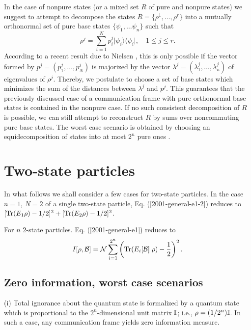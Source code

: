 In the case of nonpure states (or a mixed set $R$ of pure and nonpure states)
we suggest
to attempt to decompose the  states $R =\{\rho^1,\ldots ,\rho^r\}$
into a mutually orthonormal set of pure base states  $\{ \psi_1, \ldots \psi_n\}$
such that
\begin{equation}
\rho^j =\sum_{i=1}^N p^j_i \vert \psi_i \rangle \langle \psi_i \vert ,
\quad 1\le j\le r.
\end{equation}
According to a recent result due to Nielsen  \cite{nielsen-2000}, this is only possible
if the vector formed by $p^j=(p^j_1,\ldots , p^j_N)$ is majorized by the
vector $\lambda^j =(\lambda^j_1, \ldots ,\lambda^j_n)$ of eigenvalues of $\rho^j$.
Thereby, we postulate to choose a set of base states which minimizes
the sum of the distances  between $\lambda^j$ and $p^j$.
This guarantees that the previously discussed case of a communication frame
with pure orthonormal base states is contained in the nonpure case.
If no such consistent decomposition of $R$ is possible, we can still
attempt to reconstruct $R$ by sums over noncommuting pure base states.
The worst case scenario is obtained by choosing
an equidecomposition of
states into at most $2^n$ pure ones \cite{nielsen-2000}.

\section{Two-state particles}

In what follows we shall consider a few cases for two-state particles.
In the case $n=1$, $N=2$ of a single  two-state particle,
Eq. (\ref{2001-general-e1-2}) reduces to $ [{\rm Tr} (E_1\rho)- 1/2]^2+[{\rm Tr} (E_2\rho)- 1/2]^2$.

For $n$ $2$-state particles.
Eq. (\ref{2001-general-e1}) reduces to
\begin{equation}
I[\rho ,{\cal B} ]= {\cal N}\sum_{i=1}^{2^n} \left({\rm Tr} (E_i[{\cal B}]\;\rho) - {1 \over 2} \right)^2.
\label{2001-general-e1-2}
\end{equation}

\subsection{Zero information, worst case scenarios}

(i)
Total ignorance about the quantum state is formalized by a quantum
state which is proportional to the $2^n$-dimensional unit matrix ${\Bbb I}$; i.e., $\rho=(1/2^n){\Bbb I}$.
In such a case, any communication frame yields zero information measure.

